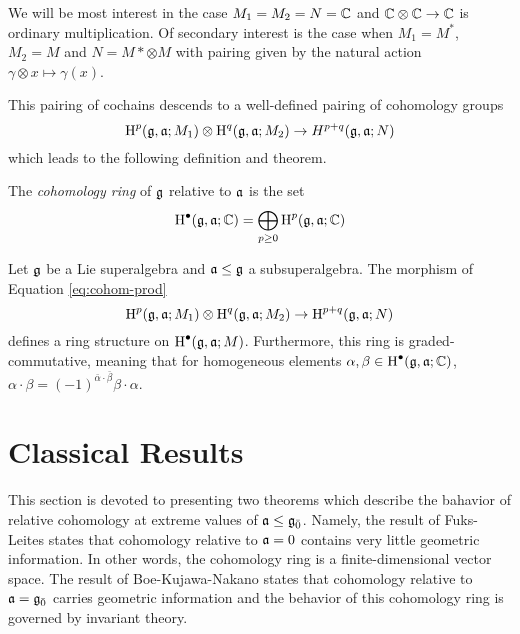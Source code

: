 We will be most interest in the case $M_1 = M_2 = N = \mathbb{C}$ and $\mathbb{C} \otimes \mathbb{C} \to \mathbb{C}$ is ordinary multiplication. Of secondary interest is the case when $M_1 = M^*$, $M_2 = M$ and $N = M* \otimes M$ with pairing given by the natural action $\gamma \otimes x \mapsto \gamma(x)$.

This pairing of cochains descends to a well-defined pairing of cohomology groups
\begin{equation}
  \label{eq:cohom-prod}
  \operatorname{H}^p(\mathfrak{g},\mathfrak{a};M_1) \otimes \operatorname{H}^q(\mathfrak{g},\mathfrak{a};M_2) \to H^{p+q}(\mathfrak{g},\mathfrak{a};N)
\end{equation}
which leads to the following definition and theorem.

\begin{definition}
  The \emph{cohomology ring} of $\mathfrak{g}$ relative to $\mathfrak{a}$ is the set
  \[
    \operatorname{H}^\bullet(\mathfrak{g},\mathfrak{a};\mathbb{C}) = \bigoplus_{p \geq 0} \operatorname{H}^p(\mathfrak{g},\mathfrak{a};\mathbb{C})
  \]
  
\end{definition}

\begin{theorem}
  Let $\mathfrak{g}$ be a Lie superalgebra and $\mathfrak{a} \leq \mathfrak{g}$ a subsuperalgebra. The morphism of Equation \ref{eq:cohom-prod}
\[
  \operatorname{H}^p(\mathfrak{g},\mathfrak{a};M_1) \otimes \operatorname{H}^q(\mathfrak{g},\mathfrak{a};M_2) \to \operatorname{H}^{p+q}(\mathfrak{g},\mathfrak{a};N)
\]
defines a ring structure on $\operatorname{H}^\bullet(\mathfrak{g},\mathfrak{a};M)$. Furthermore, this ring is graded-commutative, meaning that for homogeneous elements $\alpha, \beta \in \operatorname{H}^\bullet(\mathfrak{g},\mathfrak{a};\mathbb{C})$, $\alpha \cdot \beta = (-1)^{\bar \alpha \cdot \bar \beta} \beta \cdot \alpha$.
\end{theorem}

\section{Classical Results}
\label{sec:bkn-fuks-leites}

This section is devoted to presenting two theorems which describe the bahavior of relative cohomology at extreme values of $\mathfrak{a} \leq {\mathfrak{g}}_{\bar{0}}$. Namely, the result of Fuks-Leites states that cohomology relative to $\mathfrak{a} = 0$ contains very little geometric information. In other words, the cohomology ring is a finite-dimensional vector space. The result of Boe-Kujawa-Nakano states that cohomology relative to $\mathfrak{a} = {\mathfrak{g}}_{\bar{0}}$ carries geometric information and the behavior of this cohomology ring is governed by invariant theory.

